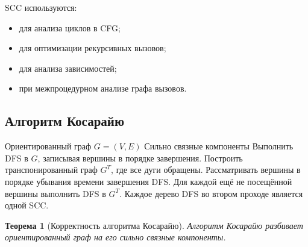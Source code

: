 \documentclass[12pt,a4paper]{article}
\newtheorem{theorem}{Теорема}
\begin{document}
SCC используются:
\begin{itemize}
    \item для анализа циклов в CFG;
    \item для оптимизации рекурсивных вызовов;
    \item для анализа зависимостей;
    \item при межпроцедурном анализе графа вызовов.
\end{itemize}

\subsection{Алгоритм Косарайю}

\begin{algorithm}[H]
\caption{Алгоритм Косарайю для поиска SCC}
\begin{algorithmic}[1]
\Require Ориентированный граф $G=(V,E)$
\Ensure Сильно связные компоненты
\State Выполнить DFS в $G$, записывая вершины в порядке завершения.
\State Построить транспонированный граф $G^T$, где все дуги обращены.
\State Рассматривать вершины в порядке убывания времени завершения DFS.
\State Для каждой ещё не посещённой вершины выполнить DFS в $G^T$.
\State Каждое дерево DFS во втором проходе является одной SCC.
\end{algorithmic}
\end{algorithm}

\begin{theorem}[Корректность алгоритма Косарайю]
Алгоритм Косарайю разбивает ориентированный граф на его сильно связные компоненты.
\end{theorem}
\end{document}
